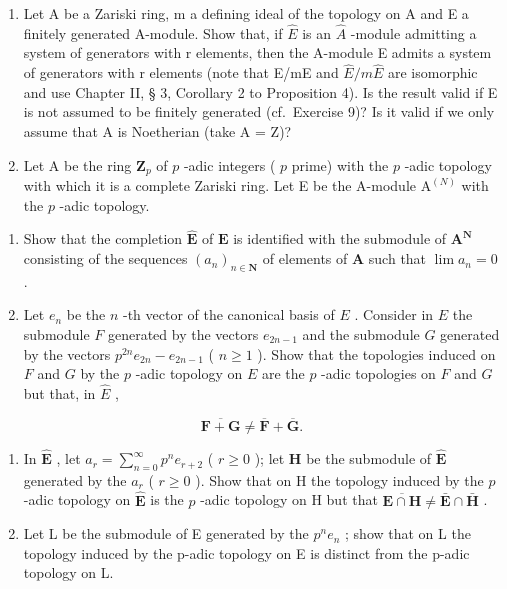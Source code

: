 \begin{enumerate}
\def\labelenumi{\arabic{enumi}.}
\setcounter{enumi}{9}
\item
  Let A be a Zariski ring, m a defining ideal of the topology on A and E a finitely generated A-module. Show that, if \(\hat{E}\) is an \(\hat{A}\) -module admitting a system of generators with r elements, then the A-module E admits a system of generators with r elements (note that E/mE and \(\hat{E}/m\hat{E}\) are isomorphic and use Chapter II, § 3, Corollary 2 to Proposition 4). Is the result valid if E is not assumed to be finitely generated (cf.~Exercise 9)? Is it valid if we only assume that A is Noetherian (take A = Z)?
\item
  Let A be the ring \(\mathbf{Z}_p\) of \(p\) -adic integers ( \(p\) prime) with the \(p\) -adic topology with which it is a complete Zariski ring. Let E be the A-module \(\mathrm{A}^{(N)}\) with the \(p\) -adic topology.
\end{enumerate}

\begin{enumerate}
\def\labelenumi{(\alph{enumi})}
\item
  Show that the completion \(\hat{\mathbf{E}}\) of \(\mathbf{E}\) is identified with the submodule of \(\mathbf{A}^{\mathbf{N}}\) consisting of the sequences \((a_{n})_{n\in \mathbf{N}}\) of elements of \(\mathbf{A}\) such that \(\lim a_n = 0\) .
\item
  Let \(e_n\) be the \(n\) -th vector of the canonical basis of \(E\) . Consider in \(E\) the submodule \(F\) generated by the vectors \(e_{2n-1}\) and the submodule \(G\) generated by the vectors \(p^{2n}e_{2n} - e_{2n-1}\) ( \(n \geqslant 1\) ). Show that the topologies induced on \(F\) and \(G\) by the \(p\) -adic topology on \(E\) are the \(p\) -adic topologies on \(F\) and \(G\) but that, in \(\hat{E}\) ,
\end{enumerate}

\[
\overline {{{\mathbf {F} + \mathbf {G}}}} \neq \overline {{{\mathbf {F}}}} + \overline {{{\mathbf {G}}}}.
\]

\begin{enumerate}
\def\labelenumi{(\alph{enumi})}
\setcounter{enumi}{2}
\item
  In \(\hat{\mathbf{E}}\) , let \(a_{r} = \sum_{n=0}^{\infty} p^{n} e_{r+2}\) ( \(r \geqslant 0\) ); let \(\mathbf{H}\) be the submodule of \(\hat{\mathbf{E}}\) generated by the \(a_{r}\) ( \(r \geqslant 0\) ). Show that on H the topology induced by the \(p\) -adic topology on \(\hat{\mathbf{E}}\) is the \(p\) -adic topology on H but that \(\overline{\mathbf{E} \cap \mathbf{H}} \neq \bar{\mathbf{E}} \cap \bar{\mathbf{H}}\) .
\item
  Let L be the submodule of E generated by the \(p^{n}e_{n}\) ; show that on L the topology induced by the p-adic topology on E is distinct from the p-adic topology on L.
\end{enumerate}

